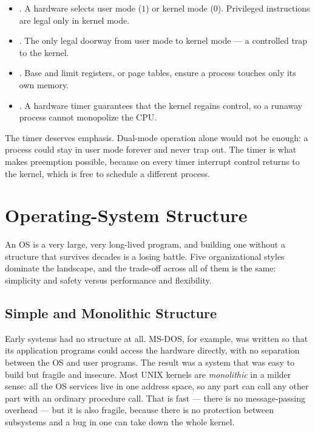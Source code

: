 \documentclass[11pt]{article}
\begin{document}
\begin{itemize}
  \item {}. A hardware  selects user mode ($1$) or kernel mode ($0$). Privileged instructions are legal only in kernel mode.
  \item {}. The only legal doorway from user mode to kernel mode --- a controlled trap to the kernel.
  \item {}. Base and limit registers, or page tables, ensure a process touches only its own memory.
  \item {}. A hardware timer guarantees that the kernel regains control, so a runaway process cannot monopolize the CPU.
\end{itemize}

The timer deserves emphasis. Dual-mode operation alone would not be enough: a process could stay in user mode forever and never trap out. The timer is what makes preemption possible, because on every timer interrupt control returns to the kernel, which is free to schedule a different process.

\section{Operating-System Structure}

An OS is a very large, very long-lived program, and building one without a structure that survives decades is a losing battle. Five organizational styles dominate the landscape, and the trade-off across all of them is the same: simplicity and safety versus performance and flexibility.

\subsection{Simple and Monolithic Structure}

Early systems had no structure at all. MS-DOS, for example, was written so that its application programs could access the hardware directly, with no separation between the OS and user programs. The result was a system that was easy to build but fragile and insecure. Most UNIX kernels are \emph{monolithic} in a milder sense: all the OS services live in one address space, so any part can call any other part with an ordinary procedure call. That is fast --- there is no message-passing overhead --- but it is also fragile, because there is no protection between subsystems and a bug in one can take down the whole kernel.
\end{document}
